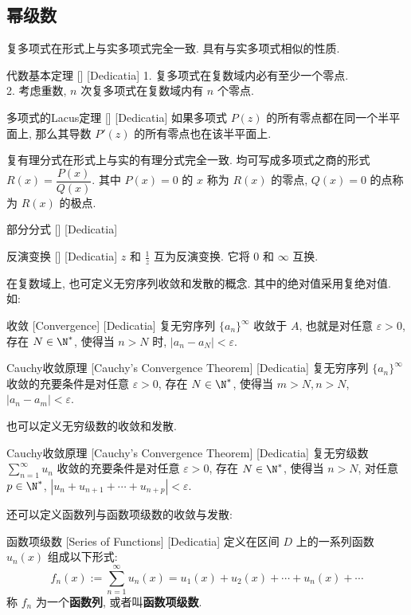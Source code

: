 \documentclass[UTF8]{ctexart}
\begin{document}
\subsection{幂级数}
复多项式在形式上与实多项式完全一致. 具有与实多项式相似的性质. 
\begin{thm}
    [UUID]
    {代数基本定理}
    []
    [Dedicatia]
    1. 复多项式在复数域内必有至少一个零点. \\
    2. 考虑重数,  \( n \) 次复多项式在复数域内有 \( n \) 个零点. 
\end{thm}
\begin{thm}
    [UUID]
    {多项式的Lacus定理}
    []
    [Dedicatia]
    如果多项式 \( P(z) \) 的所有零点都在同一个半平面上, 那么其导数 \( P'(z) \) 的所有零点也在该半平面上. 
\end{thm}
复有理分式在形式上与实的有理分式完全一致. 均可写成多项式之商的形式 \( R(x)=\dfrac{P(x)}{Q(x)} \). 其中 \( P(x)=0 \) 的 \( x \) 称为 \( R(x) \) 的零点,  \( Q(x)=0 \) 的点称为 \( R(x) \) 的极点. 
\begin{dfn}
    [UUID]
    {部分分式}
    []
    [Dedicatia]
\end{dfn}
\begin{dfn}
    [UUID]
    {反演变换}
    []
    [Dedicatia]
     \( z \) 和 \( \frac{1}{z} \) 互为反演变换. 它将 \( 0 \) 和 \( \infty \) 互换. 
\end{dfn}
在复数域上, 也可定义无穷序列收敛和发散的概念. 其中的绝对值采用复绝对值. 如: 
\begin{dfn}
    [UUID]
    {收敛}
    [Convergence]
    [Dedicatia]
    复无穷序列 \( \{a_n\}^\infty \) 收敛于 \( A \), 也就是对任意 \( \varepsilon>0 \), 存在 \( N\in\N^* \), 使得当 \( n>N \) 时,  \( |a_n-a_N|<\varepsilon \).
\end{dfn}
\begin{thm}
    [UUID]
    {Cauchy收敛原理}
    [Cauchy's Convergence Theorem]
    [Dedicatia]
    复无穷序列 \( \{a_n\}^\infty \) 收敛的充要条件是对任意 \( \varepsilon>0 \), 存在 \( N\in\N^* \), 使得当 \( m>N, n>N \),  \( |a_n-a_m|<\varepsilon \).
\end{thm}
也可以定义无穷级数的收敛和发散. 
\begin{thm}
    [UUID]
    {Cauchy收敛原理}
    [Cauchy's Convergence Theorem]
    [Dedicatia]
    复无穷级数 \( \sum_{n = 1}^{\infty} u_n \) 收敛的充要条件是对任意 \( \varepsilon>0 \), 存在 \( N\in\N^* \), 使得当 \( n>N \), 对任意 \( p\in\N^* \),  \( |u_n+u_{n+1}+\cdots+u_{n+p}|<\varepsilon \).
\end{thm}
还可以定义函数列与函数项级数的收敛与发散: 
\begin{dfn}
    [UUID]
    {函数项级数}
    [Series of Functions]
    [Dedicatia]
    定义在区间 \( D \) 上的一系列函数 \( u_n(x) \) 组成以下形式: \[f_n(x):=\sum_{n = 1}^{\infty} u_n(x)=u_1(x)+u_2(x)+\cdots+u_n(x)+\cdots \]
    称 \( f_n \) 为一个\textbf{函数列}, 或者叫\textbf{函数项级数}. 
\end{dfn}
\end{document}

